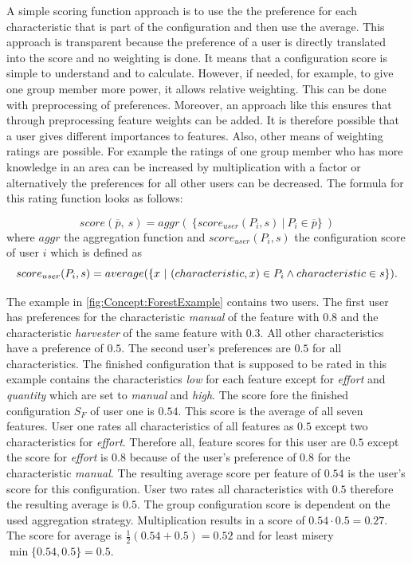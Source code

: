 A simple scoring function approach is to use the the preference for each characteristic that is part of the configuration and then use the average. This approach is transparent because the preference of a user is directly translated into the score and no weighting is done. It means that a configuration score is simple to understand and to calculate. However, if needed, for example, to give one group member more power, it allows relative weighting. This can be done with preprocessing of preferences. Moreover, an approach like this ensures that through preprocessing feature weights can be added. It is therefore possible that a user gives different importances to features. Also, other means of weighting ratings are possible. For example the ratings of one group member who has more knowledge in an area can be increased by multiplication with a factor or alternatively the preferences for all other users can be decreased.
The formula for this rating function looks as follows:

\begin{equation}
    score(\overline{p},\ s) = aggr( \ \{score_{user}(P_i, s) \ | \ P_i \in \overline{p} \} \ )
\end{equation}
where $aggr$ the aggregation function and $score_{user}(P_i, s)$ the configuration score of user $i$ which is defined as
\begin{equation}
    score_{user}(P_i, s) = average(\{x \ | \ (characteristic, x) \in P_i \land characteristic \in s \}) \notag . 
\end{equation}

The example in \autoref{fig:Concept:ForestExample} contains two users. The first user has preferences for the characteristic \emph{manual} of the feature with $0.8$ and the characteristic \emph{harvester} of the same feature with $0.3$. All other characteristics have a preference of $0.5$. The second user's preferences are $0.5$ for all characteristics. The finished configuration that is supposed to be rated in this example contains the characteristics \emph{low} for each feature except for \emph{effort} and \emph{quantity} which are set to \emph{manual} and \emph{high}. The score fore the finished configuration $S_F$ of user one is $0.54$. This score is the average of all seven features. User one rates all characteristics of all features as $0.5$ except two characteristics for \emph{effort}. Therefore all, feature scores for this user are $0.5$ except the score for \emph{effort} is $0.8$ because of the user's preference of $0.8$ for the characteristic \emph{manual}. The resulting average score per feature of $0.54$ is the user's score for this configuration. User two rates all characteristics with $0.5$ therefore the resulting average is $0.5$.
The group configuration score is dependent on the used aggregation strategy. Multiplication results in a score of $0.54 \cdot 0.5 = 0.27$. The score for average is $\frac{1}{2}(0.54 + 0.5) = 0.52$ and for least misery $\min \{0.54, 0.5\} = 0.5$.

